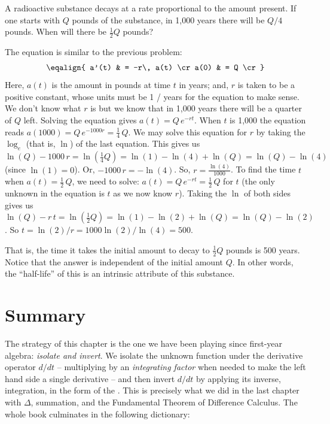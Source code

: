 A radioactive substance decays at a rate proportional to the amount present. If one starts with $Q$
pounds of the substance, in 1,000 years there will be $Q/4$ pounds. When will there be $\frac{1}{2}Q$ pounds?

The equation is similar to the previous problem:
$$
\eqalign{
a'(t) & = -r\, a(t) \cr
a(0) & = Q \cr
}
$$
Here, $a(t)$ is the amount in pounds at time $t$ in years; and, $r$ is taken to be a positive constant, whose 
units must be 1 / years for the equation to make sense. We don't know what $r$ is but we know that 
in 1,000 years there will be a quarter of $Q$ left. Solving the equation gives $a(t) = Q\, e^{-r t}$. 
When $t$ is 1,000 the equation reads
$a(1000) = Q\, e^{-1000 r} = \frac{1}{4}\,Q$. We may solve this equation for $r$ by taking the $\log_e$ (that is, $\ln$)
of the last equation. 
This gives us $\ln(Q) - 1000\, r = \ln(\frac{1}{4}Q) = \ln(1) - \ln(4)  + \ln(Q) = \ln(Q)
-\ln(4)$ (since $\ln(1) = 0$). 
Or, $-1000 \, r = -\ln(4)$.
So, $r = \frac{\ln(4)}{1000}$.
To find the time $t$ when $a(t) = \frac{1}{2}\, Q$, we need to solve:
$a(t) =Q\, e^{-r t} = \frac{1}{2}\, Q$ for $t$ (the only unknown in the equation is $t$ as we now know $r$).
Taking the $\ln$  of both sides gives us
$\ln(Q) -r\, t = \ln(\frac{1}{2}Q) = \ln(1) - \ln(2) + \ln(Q) = \ln(Q) - \ln(2) $. 
So $t = \ln(2) / r = 1000  \ln(2) / \ln(4) = 500$. 

That is, the time it takes
the initial amount to decay to $\frac{1}{2}Q$ pounds is 500 years.
Notice that the answer is independent of the initial amount $Q$. In other words, the ``half-life'' of
this  is an intrinsic attribute of this substance.



\section{Summary}
The strategy of this chapter is the one we have been playing since first-year
algebra: {\it isolate and invert\/}. We isolate the unknown function under the
derivative operator $d/dt$ -- multiplying by an {\it integrating factor\/}
when needed to make the left hand side a single derivative -- and then invert
$d/dt$ by applying its inverse, integration, in the form of the
. This is precisely what we did in the
last chapter with $\Delta$, summation, and the Fundamental Theorem of
Difference Calculus. The whole book culminates in the following dictionary:

